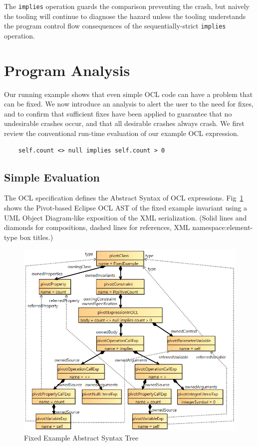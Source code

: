 \documentclass[
]{ceurart}
\begin{document}
The \verb|implies| operation guards the comparison preventing the crash, but naively the tooling will continue to diagnose the hazard unless the tooling understands the program control flow consequences of the sequentially-strict \verb|implies| operation.

\section{Program Analysis}\label{Program Analysis}

Our running example shows that even simple OCL code can have a problem that can be fixed. We now introduce an analysis to alert the user to the need for fixes, and to confirm that sufficient fixes have been applied to guarantee that no undesirable crashes occur, and that all desirable crashes always crash. We first review the conventional run-time evaluation of our example OCL expression.

\begin{verbatim}
    self.count <> null implies self.count > 0
\end{verbatim}

\subsection{Simple Evaluation}\label{Simple Evaluation}

The OCL specification defines the Abstract Syntax of OCL expressions. Fig~\ref{fig:FixedExampleAST} shows the Pivot-based Eclipse OCL AST of the fixed example invariant using a UML Object Diagram-like exposition of the XML serialization. (Solid lines and diamonds for compositions, dashed lines for references, XML namespace:element-type box titles.)

\begin{figure}
	\vspace{-10pt}
	\begin{center}
		\includegraphics[width=4.5in]{FixedExampleAST.png}
	\end{center}
	\vspace{-10pt}
	\caption{Fixed Example Abstract Syntax Tree}
	\label{fig:FixedExampleAST}
	\vspace{-10pt}
\end{figure}
\end{document}
